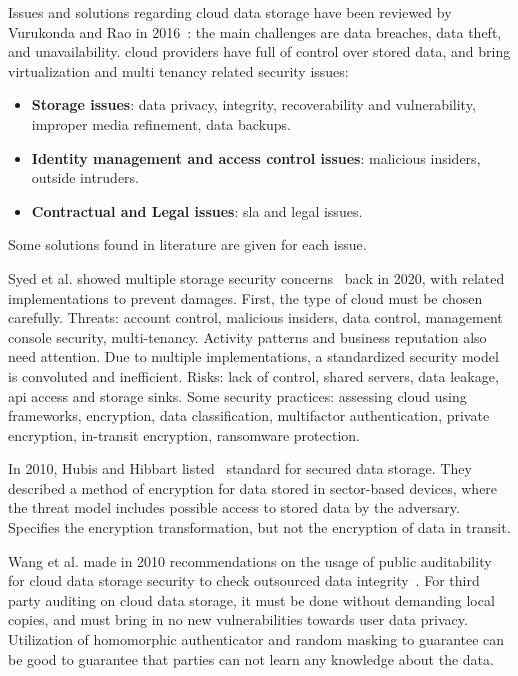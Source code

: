 Issues and solutions regarding cloud data storage have been reviewed by Vurukonda and Rao in 2016~\cite{vurukonda_study_2016}: the main challenges are data breaches, data theft, and unavailability. \Gls{cloud} providers have full of control over stored data, and bring virtualization and multi tenancy related security issues:
\begin{itemize}
	\item \textbf{Storage issues}: data privacy, integrity, recoverability and vulnerability, improper media refinement, data backups. %
	\item \textbf{Identity management and access control issues}: malicious insiders, outside intruders. %
	\item \textbf{Contractual and Legal issues}: \gls{sla} and legal issues. %
\end{itemize}

Some solutions found in literature are given for each issue.

Syed et al. showed multiple storage security concerns~\cite{syed_cloud_2020} back in 2020, with related implementations to prevent damages. First, the type of \gls{cloud} must be chosen carefully. Threats: account control, malicious insiders, data control, management console security, multi-tenancy. Activity patterns and business reputation also need attention. Due to multiple implementations, a standardized security model is convoluted and inefficient. Risks: lack of control, shared servers, data leakage, \gls{api} access and storage sinks. Some security practices: assessing \gls{cloud} using \glspl{framework}, encryption, data classification, multifactor authentication, private encryption, in-transit encryption, ransomware protection. %

In 2010, Hubis and Hibbart listed~\cite{hubis_ieee_nodate} standard for secured data storage. They described a method of encryption for data stored in sector-based devices, where the threat model includes possible access to stored data by the adversary. Specifies the encryption transformation, but not the encryption of data in transit. %

Wang et al. made in 2010 recommendations on the usage of public auditability for cloud data storage security to check outsourced data integrity~\cite{wang_privacy-preserving_2010}. For third party auditing on cloud data storage, it must be done without demanding local copies, and must bring in no new vulnerabilities towards user data privacy. Utilization of homomorphic authenticator and random masking to guarantee can be good to guarantee that parties can not learn any knowledge about the data. %

